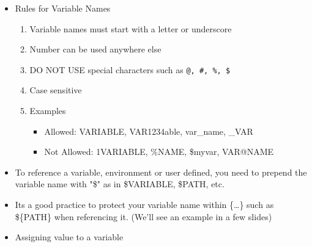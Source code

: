 \documentclass[10pt,t]{beamer}
\begin{document}
\begin{frame}
\begin{itemize}
    \item Rules for Variable Names
    \begin{enumerate}
        \item Variable names must start with a letter or underscore
        \item Number can be used anywhere else
        \item DO NOT USE special characters such as \texttt{@, \#, \%, \$}
        \item Case sensitive
        \item Examples
        \begin{itemize}
          \item Allowed: VARIABLE, VAR1234able, var\_name, \_VAR
          \item Not Allowed: 1VARIABLE, \%NAME, \$myvar, VAR@NAME 
        \end{itemize}
    \end{enumerate}
    \item To reference a variable, environment or user defined, you need to prepend the variable name with "\$" as in \$VARIABLE, \$PATH, etc.
    \item Its a good practice to protect your variable name within \{\dots\} such as \$\{PATH\} when referencing it. (We'll see an example in a few slides)
    \item Assigning value to a variable
    \begin{center}
\end{center}
\end{itemize}
\end{frame}
\end{document}

